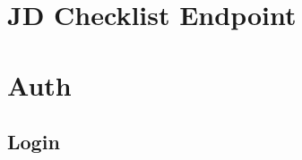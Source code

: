 \begin{appendices}
\chapter{JD Checklist Endpoint} \label{app:Endpoint}


\chapter{Auth} \label{app:Auth}
\centering
\section{Login}


\end{appendices}
